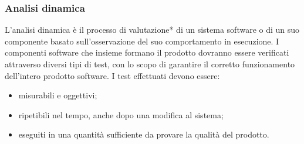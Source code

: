 \subsubsection{Analisi dinamica}
L’analisi dinamica è il processo di valutazione* di un sistema software o di un suo componente basato sull’osservazione del suo comportamento in esecuzione.
I componenti software che insieme formano il prodotto dovranno essere verificati attraverso diversi tipi di test, con lo scopo di garantire il corretto funzionamento dell'intero prodotto software.
I test effettuati devono essere:
\begin{itemize}
\item misurabili e oggettivi;
\item ripetibili nel tempo, anche dopo una modifica al sistema;
\item eseguiti in una quantità sufficiente da provare la qualità del prodotto.
\end{itemize} 
